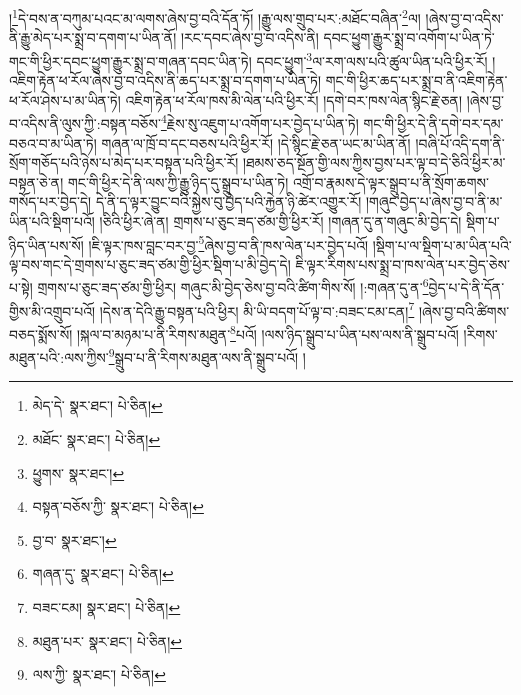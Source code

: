 །\footnote{མེད་དེ་  སྣར་ཐང་།  པེ་ཅིན། }དེ་བས་ན་བཀུམ་པའང་མ་ལགས་ཞེས་བྱ་བའི་དོན་ཏོ། །རྒྱུ་ལས་གྲུབ་པར་:མཐོང་བཞིན་\footnote{མཐོང་  སྣར་ཐང་།  པེ་ཅིན། }ལ། །ཞེས་བྱ་བ་འདིས་ནི་རྒྱུ་མེད་པར་སྨྲ་བ་དགག་པ་ཡིན་ནོ། །རང་དབང་ཞེས་བྱ་བ་འདིས་ནི། དབང་ཕྱུག་རྒྱུར་སྨྲ་བ་འགོག་པ་ཡིན་ཏེ་གང་གི་ཕྱིར་དབང་ཕྱུག་རྒྱུར་སྨྲ་བ་གཞན་དབང་ཡིན་ཏེ། དབང་ཕྱུག་\footnote{ཕྱུགས་  སྣར་ཐང་། }ལ་རག་ལས་པའི་ཚུལ་ཡིན་པའི་ཕྱིར་རོ། །འཇིག་རྟེན་ཕ་རོལ་ཞེས་བྱ་བ་འདིས་ནི་ཆད་པར་སྨྲ་བ་དགག་པ་ཡིན་ཏེ། གང་གི་ཕྱིར་ཆད་པར་སྨྲ་བ་ནི་འཇིག་རྟེན་ཕ་རོལ་ཤེས་པ་མ་ཡིན་ཏེ། འཇིག་རྟེན་ཕ་རོལ་ཁས་མི་ལེན་པའི་ཕྱིར་རོ། །དགེ་བར་ཁས་ལེན་སྙིང་རྗེ་ཅན། །ཞེས་བྱ་བ་འདིས་ནི་ལུས་ཀྱི་:བསྟན་བཅོས་\footnote{བསྟན་བཅོས་ཀྱི་  སྣར་ཐང་།  པེ་ཅིན། }རྗེས་སུ་འཇུག་པ་འགོག་པར་བྱེད་པ་ཡིན་ཏེ། གང་གི་ཕྱིར་དེ་ནི་དགེ་བར་དམ་བཅའ་བ་མ་ཡིན་ཏེ། གཞན་ལ་ཁྲོ་བ་དང་བཅས་པའི་ཕྱིར་རོ། །དེ་སྙིང་རྗེ་ཅན་ཡང་མ་ཡིན་ནོ། །བཞི་པོ་འདི་དག་ནི་སྲོག་གཅོད་པའི་ཉེས་པ་མེད་པར་བསྟན་པའི་ཕྱིར་རོ། །ཐམས་ཅད་སྔོན་གྱི་ལས་ཀྱིས་བྱས་པར་ལྟ་བ་དེ་ཅིའི་ཕྱིར་མ་བསྟན་ཅེ་ན། གང་གི་ཕྱིར་དེ་ནི་ལས་ཀྱི་རྒྱུ་ཉིད་དུ་སྒྲུབ་པ་ཡིན་ཏེ། འགྲོ་བ་རྣམས་དེ་ལྟར་སྒྲུབ་པ་ནི་སྲོག་ཆགས་གསོད་པར་བྱེད་དེ། དེ་ནི་ད་ལྟར་བྱུང་བའི་སྐྱེས་བུ་བྱེད་པའི་རྐྱེན་ཉི་ཚེར་འགྱུར་རོ། །གཞུང་བྱེད་པ་ཞེས་བྱ་བ་ནི་མ་ཡིན་པའི་སྡིག་པའོ། །ཅིའི་ཕྱིར་ཞེ་ན། གྲགས་པ་ཅུང་ཟད་ཙམ་གྱི་ཕྱིར་རོ། །གཞན་དུ་ན་གཞུང་མི་བྱེད་དེ། སྡིག་པ་ཉིད་ཡིན་པས་སོ། །ཇི་ལྟར་ཁས་བླང་བར་བྱ་\footnote{བྱ་བ་  སྣར་ཐང་། }ཞེས་བྱ་བ་ནི་ཁས་ལེན་པར་བྱེད་པའོ། །སྡིག་པ་ལ་སྡིག་པ་མ་ཡིན་པའི་ལྟ་བས་གང་དེ་གྲགས་པ་ཅུང་ཟད་ཙམ་གྱི་ཕྱིར་སྡིག་པ་མི་བྱེད་དེ། ཇི་ལྟར་རིགས་པས་སྨྲ་བ་ཁས་ལེན་པར་བྱེད་ཅེས་པ་སྟེ། གྲགས་པ་ཅུང་ཟད་ཙམ་གྱི་ཕྱིར། གཞུང་མི་བྱེད་ཅེས་བྱ་བའི་ཚིག་གིས་སོ། །:གཞན་དུ་ན་\footnote{གཞན་དུ་  སྣར་ཐང་།  པེ་ཅིན། }བྱེད་པ་དེ་ནི་དོན་གྱིས་མི་འགྲུབ་པའོ། །དེས་ན་དེའི་རྒྱུ་བསྟན་པའི་ཕྱིར། མི་ཡི་བདག་པོ་ལྟ་བ་:བཟང་ངམ་ངན།\footnote{བཟང་ངམ།  སྣར་ཐང་།  པེ་ཅིན། } །ཞེས་བྱ་བའི་ཚིགས་བཅད་སྨོས་སོ། །སྐལ་བ་མཉམ་པ་ནི་རིགས་མཐུན་\footnote{མཐུན་པར་  སྣར་ཐང་།  པེ་ཅིན། }པའོ། །ལས་ཉིད་སྒྲུབ་པ་ཡིན་པས་ལས་ནི་སྒྲུབ་པའོ། །རིགས་མཐུན་པའི་:ལས་ཀྱིས་\footnote{ལས་ཀྱི་  སྣར་ཐང་།  པེ་ཅིན། }སྒྲུབ་པ་ནི་རིགས་མཐུན་ལས་ནི་སྒྲུབ་པའོ། །
